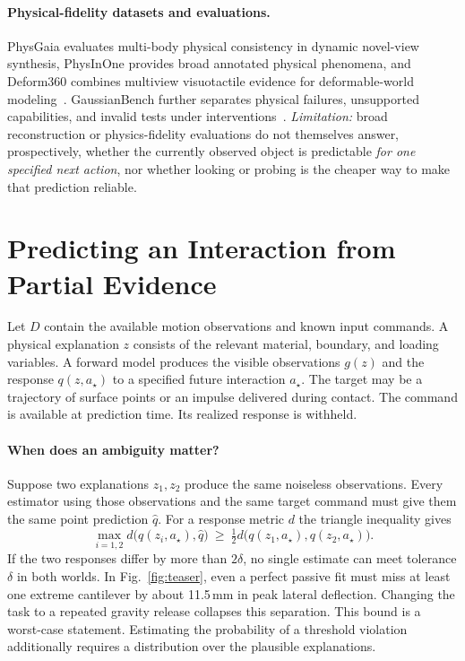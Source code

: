 \documentclass[10pt,twocolumn,letterpaper]{article}
\begin{document}
\paragraph{Physical-fidelity datasets and evaluations.}
PhysGaia evaluates multi-body physical consistency in dynamic novel-view synthesis, PhysInOne provides broad annotated physical phenomena, and Deform360 combines multiview visuotactile evidence for deformable-world modeling~\cite{kim2026physgaia,zhou2026physinone,li2026deform360}. GaussianBench further separates physical failures, unsupported capabilities, and invalid tests under interventions~\cite{dumebi2026gaussianbench}. \emph{Limitation:} broad reconstruction or physics-fidelity evaluations do not themselves answer, prospectively, whether the currently observed object is predictable \emph{for one specified next action}, nor whether looking or probing is the cheaper way to make that prediction reliable.

\section{Predicting an Interaction from Partial Evidence}
\label{sec:method}
Let $D$ contain the available motion observations and known input commands. A physical explanation $z$ consists of the relevant material, boundary, and loading variables. A forward model produces the visible observations $g(z)$ and the response $q(z,a_\star)$ to a specified future interaction $a_\star$. The target may be a trajectory of surface points or an impulse delivered during contact. The command is available at prediction time. Its realized response is withheld.

\paragraph{When does an ambiguity matter?}
Suppose two explanations $z_1,z_2$ produce the same noiseless observations. Every estimator using those observations and the same target command must give them the same point prediction $\hat q$. For a response metric $d$ the triangle inequality gives
\begin{equation}
 \max_{i=1,2} d\big(q(z_i,a_\star),\hat q\big)
 \ \geq\ \tfrac12 d\big(q(z_1,a_\star),q(z_2,a_\star)\big).
 \label{eq:ambiguity}
\end{equation}
If the two responses differ by more than $2\delta$, no single estimate can meet tolerance $\delta$ in both worlds. In Fig.~\ref{fig:teaser}, even a perfect passive fit must miss at least one extreme cantilever by about 11.5\,mm in peak lateral deflection. Changing the task to a repeated gravity release collapses this separation. This bound is a worst-case statement. Estimating the probability of a threshold violation additionally requires a distribution over the plausible explanations.
\end{document}
